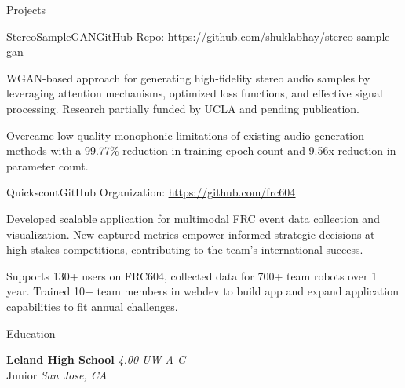 \documentclass[
  11pt, %
]{resume} %
\begin{document}

\begin{rSection}{Projects}

  
  \begin{rSubsection}{StereoSampleGAN}{}{GitHub Repo: \underline{\href{https://github.com/shuklabhay/stereo-sample-gan}{https://github.com/shuklabhay/stereo-sample-gan}}}{}
       
    \item WGAN-based approach for generating high-fidelity stereo audio samples by leveraging attention mechanisms, optimized loss functions, and effective signal processing. Research partially funded by UCLA and pending publication.
        
    \item Overcame low-quality monophonic limitations of existing audio generation methods with a 99.77\% reduction in training epoch count and 9.56x reduction in parameter count.
        
  \end{rSubsection}
      
  \begin{rSubsection}{Quickscout}{}{GitHub Organization: \underline{\href{https://github.com/frc604}{https://github.com/frc604}}}{}
       
    \item Developed scalable application for multimodal FRC event data collection and visualization. New captured metrics empower informed strategic decisions at high-stakes competitions, contributing to the team's international success.
        
    \item Supports 130+ users on FRC604, collected data for 700+ team robots over 1 year. Trained 10+ team members in webdev to build app and expand application capabilities to fit annual challenges.
        
  \end{rSubsection}
      
	
\end{rSection}
    

\begin{rSection}{Education}
	
  
  \textbf{Leland High School} \hfill \textit{4.00 UW A-G} \\
  Junior \hfill \textit{San Jose, CA}
	
\end{rSection}
\end{document}
